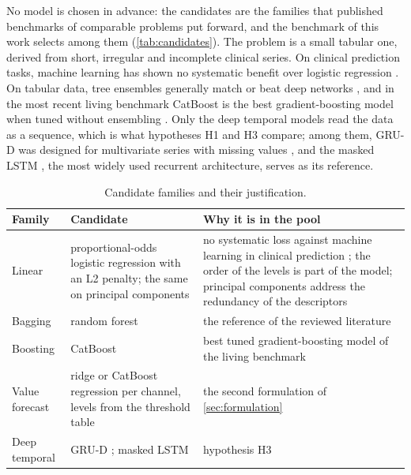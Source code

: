 No model is chosen in advance: the candidates are the families that published benchmarks of comparable problems put forward, and the benchmark of this work selects among them (\cref{tab:candidates}). The problem is a small tabular one, derived from short, irregular and incomplete clinical series. On clinical prediction tasks, machine learning has shown no systematic benefit over logistic regression \parencite{christodoulou2019}. On tabular data, tree ensembles generally match or beat deep networks \parencite{grinsztajn2022}, and in the most recent living benchmark CatBoost is the best gradient-boosting model when tuned without ensembling \parencite{erickson2025}. Only the deep temporal models read the data as a sequence, which is what hypotheses H1 and H3 compare; among them, GRU-D was designed for multivariate series with missing values \parencite{che2018}, and the masked LSTM \parencite{hochreiter1997}, the most widely used recurrent architecture, serves as its reference.

\begin{table}[htbp]
\centering\footnotesize
\caption{Candidate families and their justification.}\label{tab:candidates}\label{tab:inductive-bias}
\begin{tabularx}{\textwidth}{@{}>{\raggedright\arraybackslash}p{2.6cm} >{\raggedright\arraybackslash}p{3.6cm} X@{}}
\toprule
\textbf{Family} & \textbf{Candidate} & \textbf{Why it is in the pool} \\
\midrule
Linear & proportional-odds logistic regression \parencite{mccullagh1980} with an L2 penalty; the same on principal components & no systematic loss against machine learning in clinical prediction \parencite{christodoulou2019}; the order of the levels is part of the model; principal components address the redundancy of the descriptors \\
Bagging & random forest \parencite{breiman2001} & the reference of the reviewed literature \parencite{mendoza2025} \\
Boosting & CatBoost \parencite{prokhorenkova2018} & best tuned gradient-boosting model of the living benchmark \parencite{erickson2025} \\
Value forecast & ridge or CatBoost regression per channel, levels from the threshold table & the second formulation of \cref{sec:formulation} \\
Deep temporal & GRU-D \parencite{che2018}; masked LSTM \parencite{hochreiter1997} & hypothesis H3 \\
\bottomrule
\end{tabularx}
\end{table}

